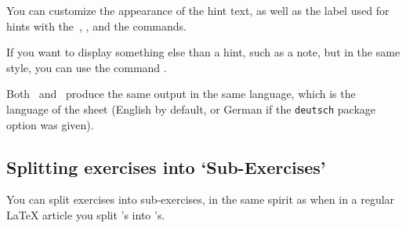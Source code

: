 \documentclass[11pt,a4paper]{article}
\begin{document}
\begin{pkgtip}
  You can customize the appearance of the hint text, as well as the label used for hints
  with the~, , and the
   commands.
\end{pkgtip}

\begin{pkgtip}
  If you want to display something else than a hint, such as a note, but in the same
  style, you can use the command .
\end{pkgtip}



\begin{pkgnotice}
  Both~ and~ produce the same output in the same
  language, which is the language of the sheet (English by default, or German if the
  \texttt{deutsch} package option was given).
\end{pkgnotice}


\subsection{Splitting exercises into `Sub-Exercises'}
\label{sec:subexercises}

You can split exercises into sub-exercises, in the same spirit as when in a regular
\LaTeX{} article you split 's into 's.


\end{document}
